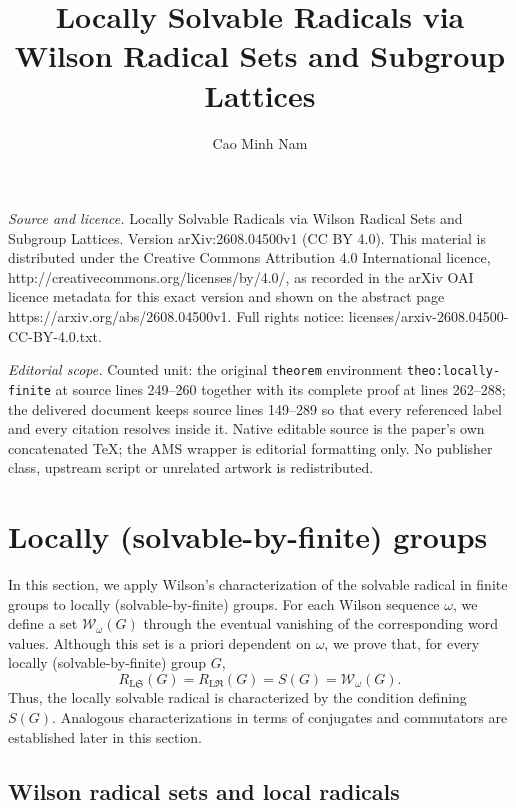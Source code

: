 \documentclass[10pt,a4paper]{amsart}
\numberwithin{equation}{section}
\numberwithin{equation}{section}
\begin{document}
\title[Locally Solvable Radicals via Wilson Radical Sets and Subgro]{Locally Solvable Radicals via Wilson Radical Sets and Subgroup Lattices}
\author{Cao Minh Nam}
\date{}
\maketitle
\noindent\emph{Source and licence.} Locally Solvable Radicals via Wilson Radical Sets and Subgroup Lattices. Version arXiv:2608.04500v1 (CC BY 4.0). This material is distributed under the Creative Commons Attribution 4.0 International licence, http://creativecommons.org/licenses/by/4.0/, as recorded in the arXiv OAI licence metadata for this exact version and shown on the abstract page https://arxiv.org/abs/2608.04500v1. Full rights notice: licenses/arxiv-2608.04500-CC-BY-4.0.txt.\par\smallskip
\noindent\textit{Editorial scope.} Counted unit: the original \texttt{theorem} environment \texttt{theo:locally-finite} at source lines 249--260 together with its complete proof at lines 262--288; the delivered document keeps source lines 149--289 so that every referenced label and every citation resolves inside it. Native editable source is the paper's own concatenated TeX; the AMS wrapper is editorial formatting only. No publisher class, upstream script or unrelated artwork is redistributed.
\section{Locally (solvable-by-finite) groups}

In this section, we apply Wilson's characterization of the solvable radical in finite groups to locally (solvable-by-finite) groups.  
For each Wilson sequence $\omega$, we define a set $\mathcal W_\omega(G)$ through the eventual vanishing of the corresponding word values. 
Although this set is a priori dependent on $\omega$, we prove that, for every locally (solvable-by-finite) group $G$, 
$$ R_{\mathrm{L}\mathfrak S}(G) = R_{\mathrm{L}\mathfrak R}(G) = S(G) = \mathcal W_\omega(G).$$ 
Thus, the locally solvable radical is characterized by the condition defining $S(G)$. 
Analogous characterizations in terms of conjugates and commutators are established later in this section. 

\subsection{Wilson radical sets and local radicals} \hfill
\end{document}
